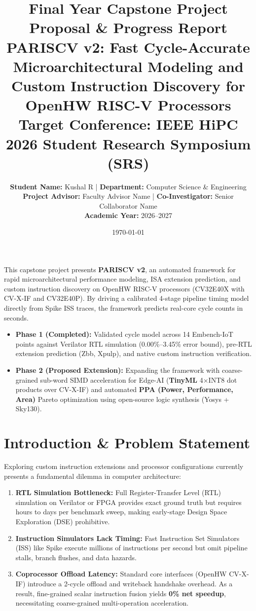 \documentclass[11pt,a4paper]{article}
\title{
    \vspace{-1.5cm}
    \textbf{\Large Final Year Capstone Project Proposal \& Progress Report}\\[0.3cm]
    \textbf{\LARGE PARISCV v2: Fast Cycle-Accurate Microarchitectural Modeling and Custom Instruction Discovery for OpenHW RISC-V Processors}\\[0.2cm]
    \large Target Conference: IEEE HiPC 2026 Student Research Symposium (SRS)
}
\author{
    \textbf{Student Name:} Kushal R \quad | \quad \textbf{Department:} Computer Science \& Engineering\\
    \textbf{Project Advisor:} Faculty Advisor Name \quad | \quad \textbf{Co-Investigator:} Senior Collaborator Name\\
    \textbf{Academic Year:} 2026--2027
}
\date{\today}
\begin{document}
\maketitle

\begin{tcolorbox}[colback=blue!5!white,colframe=blue!70!black,title=\textbf{Executive Summary}]
This capstone project presents \textbf{PARISCV v2}, an automated framework for rapid microarchitectural performance modeling, ISA extension prediction, and custom instruction discovery on OpenHW RISC-V processors (CV32E40X with CV-X-IF and CV32E40P). By driving a calibrated 4-stage pipeline timing model directly from Spike ISS traces, the framework predicts real-core cycle counts in seconds. 
\begin{itemize}[leftmargin=*,noitemsep]
    \item \textbf{Phase 1 (Completed):} Validated cycle model across 14 Embench-IoT points against Verilator RTL simulation (0.00\%--3.45\% error bound), pre-RTL extension prediction (Zbb, Xpulp), and native custom instruction verification.
    \item \textbf{Phase 2 (Proposed Extension):} Expanding the framework with coarse-grained sub-word SIMD acceleration for Edge-AI (\textbf{TinyML} 4$\times$INT8 dot products over CV-X-IF) and automated \textbf{PPA (Power, Performance, Area)} Pareto optimization using open-source logic synthesis (Yosys + Sky130).
\end{itemize}
\end{tcolorbox}

\section{Introduction \& Problem Statement}
Exploring custom instruction extensions and processor configurations currently presents a fundamental dilemma in computer architecture:
\begin{enumerate}[leftmargin=*]
    \item \textbf{RTL Simulation Bottleneck:} Full Register-Transfer Level (RTL) simulation on Verilator or FPGA provides exact ground truth but requires hours to days per benchmark sweep, making early-stage Design Space Exploration (DSE) prohibitive.
    \item \textbf{Instruction Simulators Lack Timing:} Fast Instruction Set Simulators (ISS) like Spike execute millions of instructions per second but omit pipeline stalls, branch flushes, and data hazards.
    \item \textbf{Coprocessor Offload Latency:} Standard core interfaces (OpenHW CV-X-IF) introduce a 2-cycle offload and writeback handshake overhead. As a result, fine-grained scalar instruction fusion yields \textbf{0\% net speedup}, necessitating coarse-grained multi-operation acceleration.
\end{enumerate}
\end{document}
